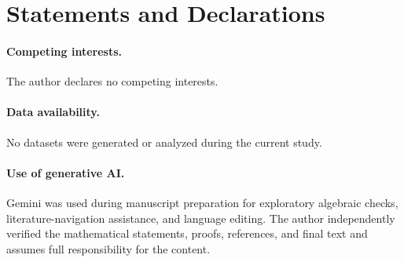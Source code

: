 \documentclass[11pt]{article}
\theoremstyle{definition}
\begin{document}
\section*{Statements and Declarations}
\paragraph{Competing interests.}
The author declares no competing interests.

\paragraph{Data availability.}
No datasets were generated or analyzed during the current study.

\paragraph{Use of generative AI.}
Gemini was used during manuscript preparation for exploratory algebraic checks, literature-navigation assistance, and language editing.  The author independently verified the mathematical statements, proofs, references, and final text and assumes full responsibility for the content.
\end{document}
